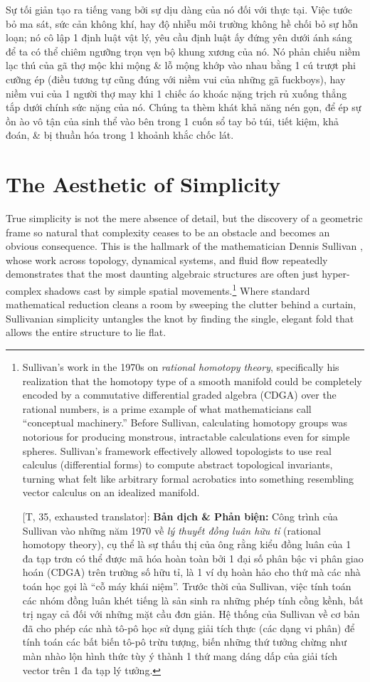 \documentclass[11pt]{article}
\begin{document}
Sự tối giản tạo ra tiếng vang bởi sự dịu dàng của nó đối với thực tại. Việc tước bỏ ma sát, sức cản không khí, hay độ nhiễu môi trường không hề chối bỏ sự hỗn loạn; nó cô lập 1 định luật vật lý, yêu cầu định luật ấy đứng yên dưới ánh sáng để ta có thể chiêm ngưỡng trọn vẹn bộ khung xương của nó. Nó phản chiếu niềm lạc thú của gã thợ mộc khi mộng \& lỗ mộng khớp vào nhau bằng 1 cú trượt phi cưỡng ép (điều tương tự cũng đúng với niềm vui của những gã fuckboys), hay niềm vui của 1 người thợ may khi 1 chiếc áo khoác nặng trịch rủ xuống thẳng tắp dưới chính sức nặng của nó. Chúng ta thèm khát khả năng nén gọn, để ép sự ồn ào vô tận của sinh thể vào bên trong 1 cuốn sổ tay bỏ túi, tiết kiệm, khả đoán, \& bị thuần hóa trong 1 khoảnh khắc chốc lát.

\section{The Aesthetic of Simplicity}
True simplicity is not the mere absence of detail, but the discovery of a geometric frame so natural that complexity ceases to be an obstacle and becomes an obvious consequence. This is the hallmark of the mathematician Dennis Sullivan \cite{Sullivan2017}, whose work across topology, dynamical systems, and fluid flow repeatedly demonstrates that the most daunting algebraic structures are often just hyper-complex shadows cast by simple spatial movements.\footnote{Sullivan's work in the 1970s on \textit{rational homotopy theory}, specifically his realization that the homotopy type of a smooth manifold could be completely encoded by a commutative differential graded algebra (CDGA) over the rational numbers, is a prime example of what mathematicians call ``conceptual machinery.'' Before Sullivan, calculating homotopy groups was notorious for producing monstrous, intractable calculations even for simple spheres. Sullivan's framework effectively allowed topologists to use real calculus (differential forms) to compute abstract topological invariants, turning what felt like arbitrary formal acrobatics into something resembling vector calculus on an idealized manifold.
	
	\textsf{[T, 35, exhausted translator]:} \textbf{Bản dịch \& Phản biện:} Công trình của Sullivan vào những năm 1970 về \textit{lý thuyết đồng luân hữu tỉ} (rational homotopy theory), cụ thể là sự thấu thị của ông rằng kiểu đồng luân của 1 đa tạp trơn có thể được mã hóa hoàn toàn bởi 1 đại số phân bậc vi phân giao hoán (CDGA) trên trường số hữu tỉ, là 1 ví dụ hoàn hảo cho thứ mà các nhà toán học gọi là ``cỗ máy khái niệm''. Trước thời của Sullivan, việc tính toán các nhóm đồng luân khét tiếng là sản sinh ra những phép tính cồng kềnh, bất trị ngay cả đối với những mặt cầu đơn giản. Hệ thống của Sullivan về cơ bản đã cho phép các nhà tô-pô học sử dụng giải tích thực (các dạng vi phân) để tính toán các bất biến tô-pô trừu tượng, biến những thứ tưởng chừng như màn nhào lộn hình thức tùy ý thành 1 thứ mang dáng dấp của giải tích vector trên 1 đa tạp lý tưởng.} Where standard mathematical reduction cleans a room by sweeping the clutter behind a curtain, Sullivanian simplicity untangles the knot by finding the single, elegant fold that allows the entire structure to lie flat.
\end{document}
